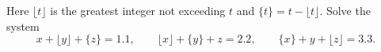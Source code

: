 Here $\lfloor t\rfloor$ is the greatest integer not exceeding $t$ and $\{t\}=t-\lfloor t\rfloor$. Solve the system
\[
x+\lfloor y\rfloor+\{z\}=1.1,\qquad \lfloor x\rfloor+\{y\}+z=2.2,\qquad \{x\}+y+\lfloor z\rfloor=3.3 .
\]
